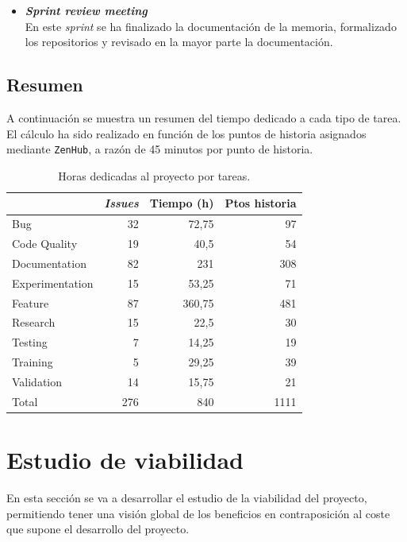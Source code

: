\begin{itemize}
\item \textbf{\textit{Sprint review meeting}}\\
En este \textit{sprint} se ha finalizado la documentación de la memoria, formalizado los repositorios y revisado en la mayor parte la documentación. 

\end{itemize}

\FloatBarrier
\subsection{Resumen}
A continuación se muestra un resumen del tiempo dedicado a cada tipo de tarea. El cálculo ha sido realizado en función de los puntos de historia asignados mediante \texttt{ZenHub}, a razón de 45 minutos por punto de historia.

\begin{table}[]
    \centering
    \begin{tabular}{lrrr}
	\toprule
        ~ & \textbf{\textit{Issues}} & \textbf{Tiempo (h)} & \textbf{Ptos historia} \\ 
        \toprule
        Bug & 32 & 72,75 & 97 \\ 
        Code Quality & 19 & 40,5 & 54 \\ 
        Documentation & 82 & 231 & 308 \\ 
        Experimentation & 15 & 53,25 & 71 \\
        Feature & 87 & 360,75 & 481 \\ 
        Research & 15 & 22,5 & 30 \\ 
        Testing & 7 & 14,25 & 19 \\ 
        Training & 5 & 29,25 & 39 \\ 
        Validation & 14 & 15,75 & 21 \\ 
    \midrule
        Total & 276 & 840 & 1111 \\ 
   	\bottomrule
    \end{tabular}
    \caption{Horas dedicadas al proyecto por tareas.}\label{tab:summary}
\end{table}


\newpage
\section{Estudio de viabilidad}
En esta sección se va a desarrollar el estudio de la viabilidad del proyecto, permitiendo tener una visión global de los beneficios en contraposición al coste que supone el desarrollo del proyecto.


